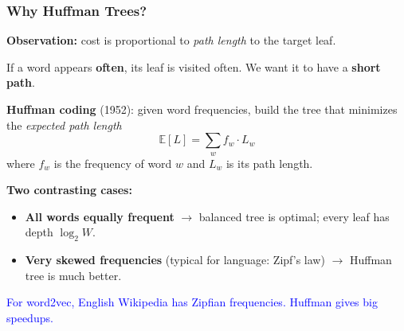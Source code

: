 \documentclass[notes,11pt, aspectratio=169]{beamer}
\begin{document}
\begin{frame}
\frametitle{Why Huffman Trees?}

\textbf{Observation:} cost is proportional to \emph{path length} to the target leaf.

\vspace{4pt}
If a word appears \textbf{often}, its leaf is visited often. We want it to have a \textbf{short path}.

\vspace{8pt}
\textbf{Huffman coding} (1952): given word frequencies, build the tree that minimizes the \emph{expected path length}
\[
    \mathbb{E}[L] = \sum_w f_w \cdot L_w
\]
where $f_w$ is the frequency of word $w$ and $L_w$ is its path length.

\vspace{8pt}
\textbf{Two contrasting cases:}
\begin{itemize}
    \item \textbf{All words equally frequent} $\to$ balanced tree is optimal; every leaf has depth $\log_2 W$.
    \item \textbf{Very skewed frequencies} (typical for language: Zipf's law) $\to$ Huffman tree is much better.
\end{itemize}

\vspace{6pt}
\textcolor{blue}{For word2vec, English Wikipedia has Zipfian frequencies. Huffman gives big speedups.}
\end{frame}
\end{document}
